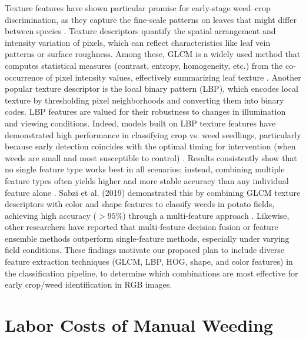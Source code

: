 \documentclass[letterpaper, notitlepage]{report}
\begin{document}
Texture features have shown particular promise for early-stage weed–crop discrimination, as they capture the fine-scale patterns on leaves that might differ between species \parencite{Garibaldi-Marquez2022-yn}. Texture descriptors quantify the spatial arrangement and intensity variation of pixels, which can reflect characteristics like leaf vein patterns or surface roughness. Among these, \gls{GLCM} is a widely used method that computes statistical measures (contrast, entropy, homogeneity, etc.) from the co-occurrence of pixel intensity values, effectively summarizing leaf texture \parencite{Wu2021-gt,Chen2020-un}. Another popular texture descriptor is the local binary pattern (LBP), which encodes local texture by thresholding pixel neighborhoods and converting them into binary codes. LBP features are valued for their robustness to changes in illumination and viewing conditions. Indeed, models built on LBP texture features have demonstrated high performance in classifying crop vs. weed seedlings, particularly because early detection coincides with the optimal timing for intervention (when weeds are small and most susceptible to control) \parencite{Chen2020-un}. Results consistently show that no single feature type works best in all scenarios; instead, combining multiple feature types often yields higher and more stable accuracy than any individual feature alone \parencite{Wu2021-gt,Chen2020-un}. Sabzi et al. (2019) demonstrated this by combining GLCM texture descriptors with color and shape features to classify weeds in potato fields, achieving high accuracy ($> 95\%$) through a multi-feature approach \parencite{Wu2021-gt}. Likewise, other researchers have reported that multi-feature decision fusion or feature ensemble methods outperform single-feature methods, especially under varying field conditions. These findings motivate our proposed plan  to include diverse feature extraction techniques (GLCM, LBP, HOG, shape, and color features) in the classification pipeline, to determine which combinations are most effective for early crop/weed identification in RGB images.

\section{Labor Costs of Manual Weeding}
\end{document}
